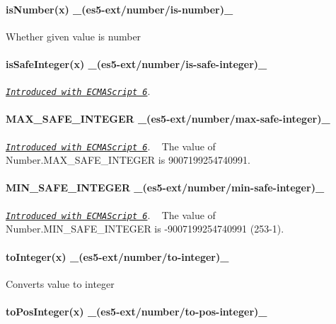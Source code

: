 \paragraph*{is\+Number(x) \+\_\+(es5-\/ext/number/is-\/number)\+\_\+}

Whether given value is number

\paragraph*{is\+Safe\+Integer(x) \+\_\+(es5-\/ext/number/is-\/safe-\/integer)\+\_\+}

\href{http://people.mozilla.org/~jorendorff/es6-draft.html#sec-number.issafeinteger}{\tt {\itshape Introduced with E\+C\+M\+A\+Script 6}}. ~\newline
 \paragraph*{M\+A\+X\+\_\+\+S\+A\+F\+E\+\_\+\+I\+N\+T\+E\+G\+ER \+\_\+(es5-\/ext/number/max-\/safe-\/integer)\+\_\+}

\href{http://people.mozilla.org/~jorendorff/es6-draft.html#sec-number.maxsafeinteger}{\tt {\itshape Introduced with E\+C\+M\+A\+Script 6}}. ~\newline
The value of Number.\+M\+A\+X\+\_\+\+S\+A\+F\+E\+\_\+\+I\+N\+T\+E\+G\+ER is 9007199254740991.

\paragraph*{M\+I\+N\+\_\+\+S\+A\+F\+E\+\_\+\+I\+N\+T\+E\+G\+ER \+\_\+(es5-\/ext/number/min-\/safe-\/integer)\+\_\+}

\href{http://people.mozilla.org/~jorendorff/es6-draft.html#sec-number.minsafeinteger}{\tt {\itshape Introduced with E\+C\+M\+A\+Script 6}}. ~\newline
The value of Number.\+M\+I\+N\+\_\+\+S\+A\+F\+E\+\_\+\+I\+N\+T\+E\+G\+ER is -\/9007199254740991 (253-\/1).

\paragraph*{to\+Integer(x) \+\_\+(es5-\/ext/number/to-\/integer)\+\_\+}

Converts value to integer

\paragraph*{to\+Pos\+Integer(x) \+\_\+(es5-\/ext/number/to-\/pos-\/integer)\+\_\+}

